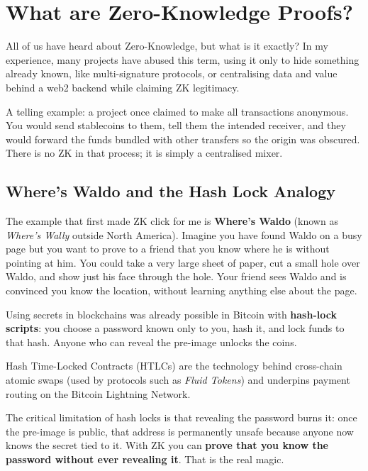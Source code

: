 
\section{What are Zero-Knowledge Proofs?}

All of us have heard about Zero-Knowledge, but what is it exactly? In my experience, many projects have abused this term, using it only to hide something already known, like multi-signature protocols, or centralising data and value behind a web2 backend while claiming ZK legitimacy.

A telling example: a project once claimed to make all transactions anonymous. You would send stablecoins to them, tell them the intended receiver, and they would forward the funds bundled with other transfers so the origin was obscured. There is no ZK in that process; it is simply a centralised mixer.

\subsection*{Where's Waldo and the Hash Lock Analogy}

The example that first made ZK click for me is \textbf{Where's Waldo} (known as \textit{Where's Wally} outside North America). Imagine you have found Waldo on a busy page but you want to prove to a friend that you know where he is without pointing at him. You could take a very large sheet of paper, cut a small hole over Waldo, and show just his face through the hole. Your friend sees Waldo and is convinced you know the location, without learning anything else about the page.

Using secrets in blockchains was already possible in Bitcoin with \textbf{hash-lock scripts}: you choose a password known only to you, hash it, and lock funds to that hash. Anyone who can reveal the pre-image unlocks the coins.

\begin{remark}
Hash Time-Locked Contracts (HTLCs) are the technology behind cross-chain atomic swaps (used by protocols such as \textit{Fluid Tokens}) and underpins payment routing on the Bitcoin Lightning Network.
\end{remark}

The critical limitation of hash locks is that revealing the password burns it: once the pre-image is public, that address is permanently unsafe because anyone now knows the secret tied to it. With ZK you can \textbf{prove that you know the password without ever revealing it}. That is the real magic.

